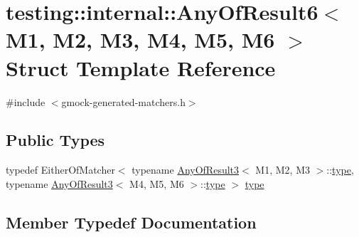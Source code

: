 \hypertarget{structtesting_1_1internal_1_1_any_of_result6}{}\section{testing\+::internal\+::Any\+Of\+Result6$<$ M1, M2, M3, M4, M5, M6 $>$ Struct Template Reference}
\label{structtesting_1_1internal_1_1_any_of_result6}


{\ttfamily \#include $<$gmock-\/generated-\/matchers.\+h$>$}

\subsection*{Public Types}
\begin{DoxyCompactItemize}
\item 
typedef Either\+Of\+Matcher$<$ typename \mbox{\hyperlink{structtesting_1_1internal_1_1_any_of_result3}{Any\+Of\+Result3}}$<$ M1, M2, M3 $>$\+::\mbox{\hyperlink{structtesting_1_1internal_1_1_any_of_result6_a15837eb05d9ac5a76c20d344a4988dd1}{type}}, typename \mbox{\hyperlink{structtesting_1_1internal_1_1_any_of_result3}{Any\+Of\+Result3}}$<$ M4, M5, M6 $>$\+::\mbox{\hyperlink{structtesting_1_1internal_1_1_any_of_result6_a15837eb05d9ac5a76c20d344a4988dd1}{type}} $>$ \mbox{\hyperlink{structtesting_1_1internal_1_1_any_of_result6_a15837eb05d9ac5a76c20d344a4988dd1}{type}}
\end{DoxyCompactItemize}


\subsection{Member Typedef Documentation}
\mbox{\label{structtesting_1_1internal_1_1_any_of_result6_a15837eb05d9ac5a76c20d344a4988dd1}} 

